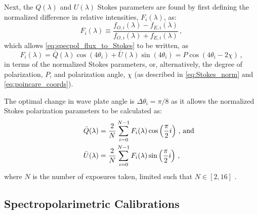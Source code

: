 Next, the $Q(\lambda)$ and $U(\lambda)$ Stokes parameters are found by first defining the normalized difference in relative intensities, $F_{i}(\lambda)$, as:
\begin{equation} \label{eq:specpol_norm_flux}
    F_{i}(\lambda) \equiv \frac{f_{O, i}(\lambda) - f_{E, i}(\lambda)}{f_{O, i}(\lambda) + f_{E, i}(\lambda)}\,,
\end{equation}
which allows \autoref{eq:specpol_flux_to_Stokes} to be written, as
\begin{equation} \label{eq:specpol_F_to_params}
    F_{i}(\lambda) = \bar{Q}(\lambda) \cos(4\theta_{i}) + \bar{U}(\lambda) \sin(4\theta_{i}) = P\cos(4\theta_{i} - 2\chi)\,,
\end{equation}
in terms of the normalized Stokes parameters, or, alternatively, the degree of polarization, $P$, and polarization angle, $\chi$ (as described in \autoref{eq:Stokes_norm} and \ref{eq:poincare_coords}).

The optimal change in wave plate angle is $\Delta\theta_{i} = \pi/8$ as it allows the normalized Stokes polarization parameters to be calculated as:
\begin{equation} \label{eq:specpol_Stokes_sol}
    \begin{aligned}
        \bar{Q}(\lambda) &= \frac{2}{N} \sum_{i = 0}^{N - 1} F_{i}(\lambda) \cos\left(\frac{\pi}{2} i\right) \rlap{\,,\ and}\\
        \bar{U}(\lambda) &= \frac{2}{N} \sum_{i = 0}^{N - 1} F_{i}(\lambda) \sin\left(\frac{\pi}{2} i\right)\,,
    \end{aligned}
\end{equation}
where $N$ is the number of exposures taken, limited such that $N \in [2, 16]$ \citep{polarimetry_error}.


\subsection{Spectropolarimetric Calibrations} \label{subsec:specpol_cal}

